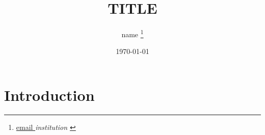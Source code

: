 \documentclass[a4paper,draft]{article}
\title{TITLE}
\author{ {{ name }}%
    \thanks{\href{mailto: {{ email }} }{ {{ email }} } \newline \textit{ {{ institution }} }%
        }
    }
\date{\today}
\begin{document}
\maketitle

\section{Introduction}



\end{document}

